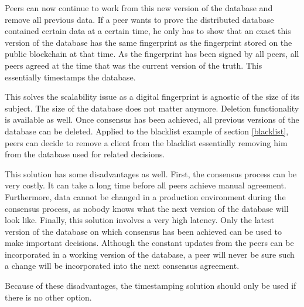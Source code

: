 Peers can now continue to work from this new version of the database and remove all previous data. If a peer wants to prove the distributed database contained certain data at a certain time, he only has to show that an exact this version of the database has the same fingerprint as the fingerprint stored on the public blockchain at that time. As the fingerprint has been signed by all peers, all peers agreed at the time that was the current version of the truth. This essentially timestamps the database.


This solves the scalability issue as a digital fingerprint is agnostic of the size of its subject. The size of the database does not matter anymore. Deletion functionality is available as well. Once consensus has been achieved, all previous versions of the database can be deleted. Applied to the blacklist example of section \ref{blacklist}, peers can decide to remove a client from the blacklist essentially removing him from the database used for related decisions.


\iffalse
disadvantages: 
- very costly consensus process: manual agreement on the data can take a long time, during the consensus process, the data cannot be changed in a production environment.
- very high latency: only the database on which there has been achieved consensus can be used to make important decisions. the constant changes from peers can be incorporated into small decisions, but a peer is never sure such a change will be incorporated in the next consensus agreement.
\fi

This solution has some disadvantages as well. First, the consensus process can be very costly. It can take a long time before all peers achieve manual agreement. Furthermore, data cannot be changed in a production environment during the consensus process, as nobody knows what the next version of the database will look like. Finally, this solution involves a very high latency. Only the latest version of the database on which consensus has been achieved can be used to make important decisions. Although the constant updates from the peers can be incorporated in a working version of the database, a peer will never be sure such a change will be incorporated into the next consensus agreement.

Because of these disadvantages, the timestamping solution should only be used if there is no other option.